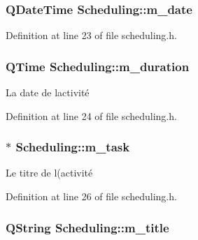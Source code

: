 \subsubsection[{m\+\_\+date}]{\setlength{\rightskip}{0pt plus 5cm}Q\+Date\+Time Scheduling\+::m\+\_\+date\hspace{0.3cm}{\ttfamily [protected]}}\label{class_scheduling_a1f0fd5013f53a2e21c8e8fe372bdd995}


Definition at line 23 of file scheduling.\+h.

\hypertarget{class_scheduling_a4f68ae25783c736a6056d944bcd9c6c9}{}
\subsubsection[{m\+\_\+duration}]{\setlength{\rightskip}{0pt plus 5cm}Q\+Time Scheduling\+::m\+\_\+duration\hspace{0.3cm}{\ttfamily [protected]}}\label{class_scheduling_a4f68ae25783c736a6056d944bcd9c6c9}


La date de l\textquotesingle{}activité 



Definition at line 24 of file scheduling.\+h.

\hypertarget{class_scheduling_a0047ba609aef28fb9c07db1245e14a56}{}
\subsubsection[{m\+\_\+task}]{$\ast$ Scheduling\+::m\+\_\+task\hspace{0.3cm}{\ttfamily [protected]}}\label{class_scheduling_a0047ba609aef28fb9c07db1245e14a56}


Le titre de l(\textquotesingle{}activité 



Definition at line 26 of file scheduling.\+h.

\hypertarget{class_scheduling_a5c62b4b778b6285407cad0ad9c593cf7}{}
\subsubsection[{m\+\_\+title}]{\setlength{\rightskip}{0pt plus 5cm}Q\+String Scheduling\+::m\+\_\+title\hspace{0.3cm}{\ttfamily [protected]}}\label{class_scheduling_a5c62b4b778b6285407cad0ad9c593cf7}


